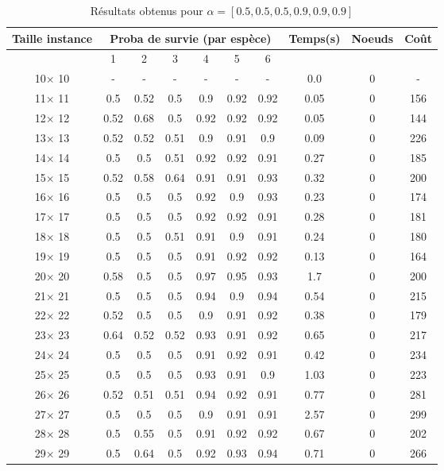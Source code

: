 \documentclass[main.tex]{subfiles}
\begin{document}
\begin{table}
    \centering
    \caption{Résultats obtenus pour $\alpha = [0.5, 0.5, 0.5, 0.9, 0.9, 0.9]$}
    \begin{tabular}{|c|c|c|c|c|c|c|c|c|c|}
	\hline
	\textbf{Taille instance} &\multicolumn{6}{c}{\textbf{Proba de survie (par espèce)}} &\textbf{Temps(s)} &\textbf{Noeuds} &\textbf{Coût}\\
	\hline
	 &1 &2 &3 &4 &5 &6 & & &\\
	\hline

10$\times$ 10 & -  & -  & -  & -  & -  & -  &0.0 &0 & - \\
11$\times$ 11 &0.5 &0.52 &0.5 &0.9 &0.92 &0.92 &0.05 &0 &156\\
12$\times$ 12 &0.52 &0.68 &0.5 &0.92 &0.92 &0.92 &0.05 &0 &144\\
13$\times$ 13 &0.52 &0.52 &0.51 &0.9 &0.91 &0.9 &0.09 &0 &226\\
14$\times$ 14 &0.5 &0.5 &0.51 &0.92 &0.92 &0.91 &0.27 &0 &185\\
15$\times$ 15 &0.52 &0.58 &0.64 &0.91 &0.91 &0.93 &0.32 &0 &200\\
16$\times$ 16 &0.5 &0.5 &0.5 &0.92 &0.9 &0.93 &0.23 &0 &174\\
17$\times$ 17 &0.5 &0.5 &0.5 &0.92 &0.92 &0.91 &0.28 &0 &181\\
18$\times$ 18 &0.5 &0.5 &0.51 &0.91 &0.9 &0.91 &0.24 &0 &180\\
19$\times$ 19 &0.5 &0.5 &0.5 &0.91 &0.92 &0.92 &0.13 &0 &164\\
20$\times$ 20 &0.58 &0.5 &0.5 &0.97 &0.95 &0.93 &1.7 &0 &200\\
21$\times$ 21 &0.5 &0.5 &0.5 &0.94 &0.9 &0.94 &0.54 &0 &215\\
22$\times$ 22 &0.52 &0.5 &0.5 &0.9 &0.91 &0.92 &0.38 &0 &179\\
23$\times$ 23 &0.64 &0.52 &0.52 &0.93 &0.91 &0.92 &0.65 &0 &217\\
24$\times$ 24 &0.5 &0.5 &0.5 &0.91 &0.92 &0.91 &0.42 &0 &234\\
25$\times$ 25 &0.5 &0.5 &0.5 &0.93 &0.91 &0.9 &1.03 &0 &223\\
26$\times$ 26 &0.52 &0.51 &0.51 &0.94 &0.92 &0.91 &0.77 &0 &281\\
27$\times$ 27 &0.5 &0.5 &0.5 &0.9 &0.91 &0.91 &2.57 &0 &299\\
28$\times$ 28 &0.5 &0.55 &0.5 &0.91 &0.92 &0.92 &0.67 &0 &202\\
29$\times$ 29 &0.5 &0.64 &0.5 &0.92 &0.93 &0.94 &0.71 &0 &266\\

\end{tabular}
\end{table}
\end{document}
